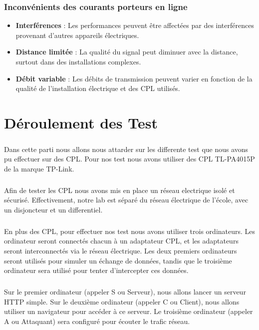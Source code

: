 \documentclass[a4paper,twocolumn]{report}
\begin{document}
\subsection{Inconvénients des courants porteurs en ligne}
\begin{itemize}
    \item \textbf{Interférences} : Les performances peuvent être affectées par des interférences provenant d'autres appareils électriques.
    \item \textbf{Distance limitée} : La qualité du signal peut diminuer avec la distance, surtout dans des installations complexes.
    \item \textbf{Débit variable} : Les débits de transmission peuvent varier en fonction de la qualité de l'installation électrique et des CPL utilisés.
\end{itemize}



\chapter{Déroulement des Test}
\paragraph{}Dans cette parti nous allons nous attarder sur les differente test que nous avons pu effectuer sur des CPL. Pour nos test nous avons utiliser des CPL TL-PA4015P de la marque TP-Link.
\paragraph{}Afin de tester les CPL nous avons mis en place un réseau electrique isolé et sécurisé. Effectivement, notre lab est séparé du réseau électrique de l'école, avec un disjoncteur et un differentiel.
\paragraph{}En plus des CPL, pour effectuer nos test nous avons utiliser trois ordinateurs. Les ordinateur seront connectés chacun à un adaptateur CPL, et les adaptateurs seront interconnectés via le réseau électrique. Les deux premiers ordinateurs seront utilisés pour simuler un échange de données, tandis que le troisième ordinateur sera utilisé pour tenter d'intercepter ces données.
\paragraph{}Sur le premier ordinateur (appeler S ou Serveur), nous allons lancer un serveur HTTP simple. Sur le deuxième ordinateur (appeler C ou Client), nous allons utiliser un navigateur pour accéder à ce serveur. Le troisième ordinateur (appeler A ou Attaquant) sera configuré pour écouter le trafic réseau.
\end{document}
